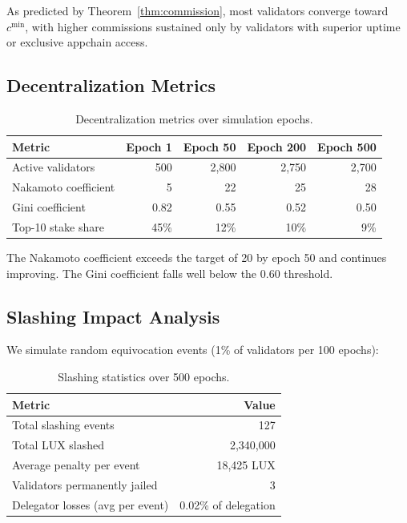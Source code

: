 As predicted by Theorem~\ref{thm:commission}, most validators converge toward $c^{\min}$, with higher commissions sustained only by validators with superior uptime or exclusive appchain access.

\subsection{Decentralization Metrics}

\begin{table}[H]
\centering
\caption{Decentralization metrics over simulation epochs.}
\label{tab:decentralization}
\begin{tabular}{lrrrr}
\toprule
\textbf{Metric} & \textbf{Epoch 1} & \textbf{Epoch 50} & \textbf{Epoch 200} & \textbf{Epoch 500} \\
\midrule
Active validators & 500 & 2,800 & 2,750 & 2,700 \\
Nakamoto coefficient & 5 & 22 & 25 & 28 \\
Gini coefficient & 0.82 & 0.55 & 0.52 & 0.50 \\
Top-10 stake share & 45\% & 12\% & 10\% & 9\% \\
\bottomrule
\end{tabular}
\end{table}

The Nakamoto coefficient exceeds the target of 20 by epoch 50 and continues improving. The Gini coefficient falls well below the 0.60 threshold.

\subsection{Slashing Impact Analysis}

We simulate random equivocation events (1\% of validators per 100 epochs):

\begin{table}[H]
\centering
\caption{Slashing statistics over 500 epochs.}
\label{tab:slashing_stats}
\begin{tabular}{lr}
\toprule
\textbf{Metric} & \textbf{Value} \\
\midrule
Total slashing events & 127 \\
Total LUX slashed & 2,340,000 \\
Average penalty per event & 18,425 LUX \\
Validators permanently jailed & 3 \\
Delegator losses (avg per event) & 0.02\% of delegation \\
\bottomrule
\end{tabular}
\end{table}

